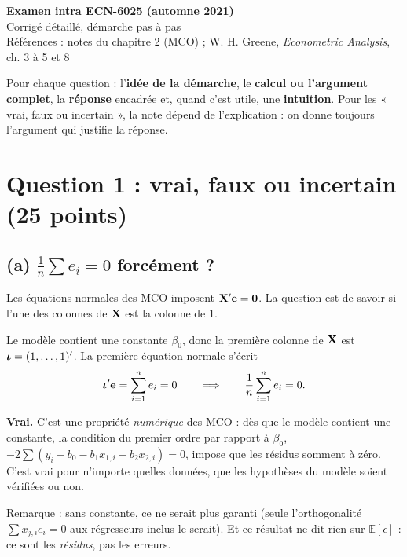 \documentclass[11pt,a4paper]{article}
\newcommand{\ve}{\mathbf{e}}\newcommand{\vb}{\mathbf{b}}\newcommand{\vx}{\mathbf{x}}
\newcommand{\E}{\mathbb{E}}\newcommand{\Var}{\operatorname{Var}}\newcommand{\Cov}{\operatorname{Cov}}
\newcommand{\sumi}{\sum_{i=1}^{n}}
\begin{document}
\begin{center}
{\LARGE\bfseries Examen intra ECN-6025 (automne 2021)}\\[6pt]
{\large Corrigé détaillé, démarche pas à pas}\\[4pt]
{\small Références : notes du chapitre 2 (MCO) ; W. H. Greene, \emph{Econometric Analysis}, ch. 3 à 5 et 8}
\end{center}

\begin{tcolorbox}[colback=white,colframe=NavyBlue,title=Comment lire ce corrigé]
Pour chaque question : l'\textbf{idée de la démarche}, le \textbf{calcul ou l'argument complet}, la \textbf{réponse} encadrée et, quand c'est utile, une \textbf{intuition}. Pour les « vrai, faux ou incertain », la note dépend de l'explication : on donne toujours l'argument qui justifie la réponse.
\end{tcolorbox}

\tableofcontents

\section{Question 1 : vrai, faux ou incertain (25 points)}

\subsection*{(a) $\frac1n\sum e_i=0$ forcément ?}

\begin{idee}
Les équations normales des MCO imposent $\vX'\ve=\mathbf 0$. La question est de savoir si l'une des colonnes de $\mathbf{X}$ est la colonne de 1.
\end{idee}

Le modèle contient une constante $\beta_0$, donc la première colonne de $\mathbf{X}$ est $\bm{\iota}=(1,\dots,1)'$. La première équation normale s'écrit
\[
\vi'\ve=\sumi e_i=0\qquad\Longrightarrow\qquad \frac1n\sumi e_i=0 .
\]

\begin{reponse}
\textbf{Vrai.} C'est une propriété \emph{numérique} des MCO : dès que le modèle contient une constante, la condition du premier ordre par rapport à $\beta_0$, $-2\sum(y_i-b_0-b_1x_{1,i}-b_2x_{2,i})=0$, impose que les résidus somment à zéro. C'est vrai pour n'importe quelles données, que les hypothèses du modèle soient vérifiées ou non.

Remarque : sans constante, ce ne serait plus garanti (seule l'orthogonalité $\sum x_{j,i}e_i=0$ aux régresseurs inclus le serait). Et ce résultat ne dit rien sur $\E[\epsilon]$ : ce sont les \emph{résidus}, pas les erreurs.
\end{reponse}
\end{document}
